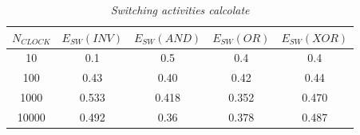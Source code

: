 \begin{table}[!h]\footnotesize
	\centering
	\begin{tabular}{|c|c|c|c|c|}
		\hline
		\textbf{$N_{CLOCK}$} & \textbf{$E_{SW}(INV)$}& \textbf{$E_{SW}(AND)$}& \textbf{$E_{SW}(OR)$} &\textbf{$E_{SW}(XOR)$}\\
		\hline
		10 & 0.1  & 0.5& 0.4&0.4\\
		\hline
		100 &  0.43 &0.40&0.42& 0.44\\
		\hline
		1000& 0.533& 0.418&0.352&0.470\\
		\hline
		10000& 0.492& 0.36&0.378&0.487\\
		\hline
	\end{tabular}
	\caption{\textit{Switching activities calcolate}}
	\label{Tab1_2}
\end{table}\\

